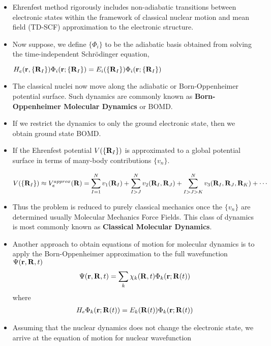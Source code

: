 \documentclass[slidestop,mathserif,compress,xcolor=svgnames]{beamer}
\begin{document}
\begin{frame}[allowframebreaks]
  \begin{itemize}
  \item Ehrenfest method rigorously includes non-adiabatic transitions between electronic states within the framework of classical nuclear motion and mean field (TD-SCF) approximation to the electronic structure.
  \item Now suppose, we define $\{\Phi_i\}$ to be the adiabatic basis obtained from solving the time-independent Schr\"{o}dinger equation,
    \begin{center}
      $H_e({\bf r},\{{\bf R}_I\})\Phi_i({\bf r};\{{\bf R}_I\}) = E_i(\{{\bf R}_I\})\Phi_i({\bf r};\{{\bf R}_I\})$
    \end{center}
  \item The classical nuclei now move along the adiabatic or Born-Oppenheimer potential surface. Such dynamics are commonly known as \textbf{Born-Oppenheimer Molecular Dynamics} or BOMD.
  \item If we restrict the dynamics to only the ground electronic state, then we obtain ground state BOMD.
  \item If the Ehrenfest potential $V(\{{\bf R}_I\})$ is approximated to a global potential surface in terms of many-body contributions $\{v_n\}$.
    \begin{center}
      $V(\{{\bf R}_I\}) \approx V^{approx}_e({\bf R}) = \displaystyle{\sum^{N}_{I=1}v_1({\bf R}_I) + \sum^N_{I>J}v_2({\bf R}_I,{\bf R}_J) +\sum^N_{I>J>K}v_3({\bf R}_I,{\bf R}_J,{\bf R}_K)} + \cdots$
    \end{center}
  \item Thus the problem is reduced to purely classical mechanics once the $\{v_n\}$ are determined usually Molecular Mechanics Force Fields. This class of dynamics is most commonly known as {\bf Classical Molecular Dynamics}.
  \item Another approach to obtain equations of motion for  molecular dynamics is to apply the Born-Oppenheimer approximation to the full wavefunction $\Psi({\bf r},{\bf R},t)$
    \begin{align*}
      \Psi({\bf r},{\bf R},t) = \sum_k \chi_k({\bf R},t)\Phi_k({\bf r};{\bf R}(t))
    \end{align*}
    where
    \begin{align*}
      H_e\Phi_k({\bf r};{\bf R}(t)) = E_k({\bf R}(t))\Phi_k({\bf r};{\bf R}(t))
    \end{align*}
  \item Assuming that the nuclear dynamics does not change the electronic state, we arrive at the equation of motion for nuclear wavefunction 

\end{itemize}
\end{frame}
\end{document}
